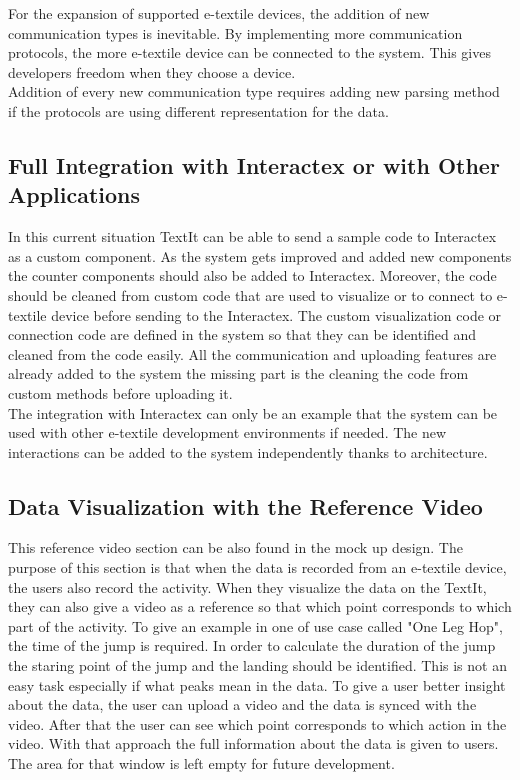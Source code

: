 For the expansion of supported e-textile devices, the addition of new communication types is inevitable. By implementing more communication protocols, the more e-textile device can be connected to the system. This gives developers freedom when they choose a device. \\

Addition of every new communication type requires adding new parsing method if the protocols are using different representation for the data.

\subsection{Full Integration with Interactex or with Other Applications}
In this current situation TextIt can be able to send a sample code to Interactex as a custom component. As the system gets improved and added new components the counter components should also be added to Interactex. Moreover, the code should be cleaned from custom code that are used to visualize or to connect to e-textile device before sending to the Interactex. The custom visualization code or connection code are defined in the system so that they can be identified and cleaned from the code easily. All the communication and uploading features are already added to the system the missing part is the cleaning the code from custom methods before uploading it.\\ 

The integration with Interactex can only be an example that the system can be used with other e-textile development environments if needed. The new interactions can be added to the system independently thanks to architecture.

\subsection{Data Visualization with the Reference Video}

This reference video section can be also found in the mock up design. The purpose of this section is that when the data is recorded from an e-textile device, the users also record the activity. When they visualize the data on the TextIt, they can also give a video as a reference so that which point corresponds to which part of the activity. To give an example in one of use case called "One Leg Hop", the time of the jump is required. In order to calculate the duration of the jump the staring point of the jump and the landing should be identified. This is not an easy task especially if what peaks mean in the data. To give a user better insight about the data, the user can upload a video and the data is synced with the video. After that the user can see which point corresponds to which action in the video. With that approach the full information about the data is given to users. The area for that window is left empty for future development.

